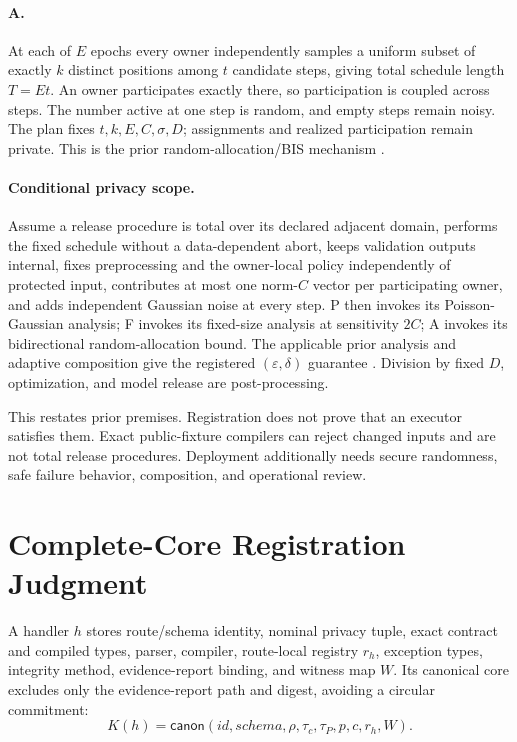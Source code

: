 \documentclass[letterpaper]{article}
\begin{document}
\paragraph{A.}
At each of $E$ epochs every owner independently samples a uniform subset of
exactly $k$ distinct positions among $t$ candidate steps, giving total schedule
length $T=Et$.  An owner participates
exactly there, so participation is coupled across steps.  The number active at
one step is random, and empty steps remain noisy.  The plan fixes
$t,k,E,C,\sigma,D$; assignments and realized participation remain private.
This is the prior random-allocation/BIS mechanism
\citep{shenfeld2025randomallocation,dong2026lessrandom}.

\paragraph{Conditional privacy scope.}
Assume a release procedure is total over its declared adjacent domain,
performs the fixed schedule without a data-dependent abort, keeps validation
outputs internal, fixes preprocessing and the owner-local policy independently
of protected input, contributes at most one norm-$C$ vector per participating
owner, and adds independent Gaussian noise at every step.  P then invokes its
Poisson-Gaussian analysis; F invokes its fixed-size analysis at sensitivity
$2C$; A invokes its bidirectional random-allocation bound.  The applicable
prior analysis and adaptive composition give the registered
$(\varepsilon,\delta)$ guarantee \citep{mironov2017renyi,
shenfeld2025randomallocation}.  Division by fixed $D$, optimization, and model
release are post-processing.

This restates prior premises.  Registration does not prove that an executor
satisfies them.  Exact public-fixture compilers can reject changed inputs and
are not total release procedures.  Deployment additionally needs secure
randomness, safe failure behavior, composition, and operational review.

\section{Complete-Core Registration Judgment}

A handler $h$ stores route/schema identity, nominal privacy tuple, exact
contract and compiled types, parser, compiler, route-local registry $r_h$, exception
types, integrity method, evidence-report binding, and witness map $W$.  Its
canonical core excludes only the evidence-report path and digest, avoiding a
circular commitment:
\[
 K(h)=\mathsf{canon}(\mathit{id},\mathit{schema},\rho,
 \tau_c,\tau_P,p,c,r_h,W).
\]
\end{document}
